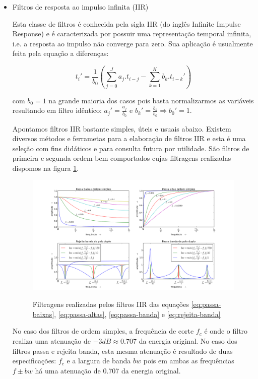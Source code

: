 \begin{itemize}
\item Filtros de resposta ao impulso infinita (IIR)

Esta classe de filtros é
conhecida pela sigla IIR (do inglês Infinite Impulse Response)
e é caracterizada por possuir uma representação temporal
infinita, i.e. a resposta ao impulso não converge para zero. Sua aplicação é usualmente feita pela equação
a diferenças:

\begin{equation}
t_i' = \frac{1}{b_0}\left ( \sum_{j=0}^Ja_j . t_{i-j} - \sum_{k=1}^Kb_k . t_{i-k}' \right )
\end{equation}

com $b_0=1$ na grande maioria dos casos pois basta normalizarmos as variáveis
resultando em filtro idêntico: $a_j'=\frac{a_j}{b_0}$ e $b_k'=\frac{b_k}{b_0} \Rightarrow b_0' = 1$.

Apontamos filtros IIR bastante simples, úteis e usuais abaixo. Existem
diversos métodos e ferrametas para a elaboração de filtros IIR
e esta é uma seleção com fins didáticos e para consulta futura por
utilidade.
São filtros de primeira e segunda ordem bem comportados cujas
filtragens realizadas dispomos na figura \ref{fig:iir}.

\begin{figure}[h!]
    \centering
    \caption{Filtragens realizadas pelos filtros IIR das equações \ref{eq:passa-baixas}, \ref{eq:passa-altas}, \ref{eq:passa-banda} e \ref{eq:rejeita-banda}}
        \includegraphics[width=\textwidth]{figuras/iir___}
        \label{fig:iir}
\end{figure}

No caso dos filtros de ordem simples, a frequência de corte $f_c$ é onde 
o filtro realiza uma atenuação de $-3dB \approx 0.707 $ da energia original.
No caso dos filtros passa e rejeita banda, esta mesma atenuação é
resultado de duas especificações: $f_c$ e a largura de banda $bw$
pois em ambas as frequências $f \pm bw$ há uma atenuação de 0.707 da energia original.


\end{itemize}
